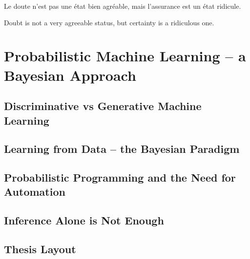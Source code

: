 
\begin{savequote}[8cm]
	\textlatin{Le doute n'est pas une état bien agréable, mais l'assurance est un état ridicule.}
	
	Doubt is not a very agreeable status, but certainty is a ridiculous one.
\end{savequote}

\chapter{Probabilistic Machine Learning -- a Bayesian Approach}
\label{chp:intro}




\section{Discriminative vs Generative Machine Learning}
\label{sec:intro:discrim}



\section{Learning from Data -- the Bayesian Paradigm}
\label{sec:intro:bayes}



\section{Probabilistic Programming and the Need for Automation}

\section{Inference Alone is Not Enough}

\section{Thesis Layout}